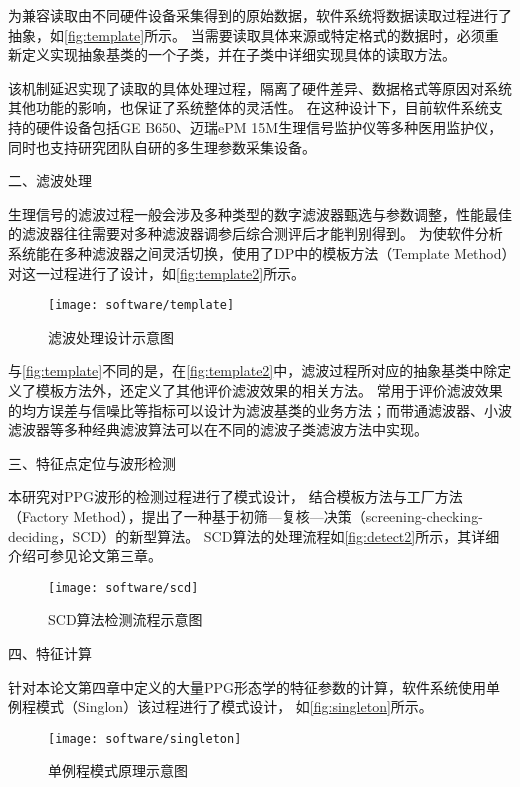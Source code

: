 为兼容读取由不同硬件设备采集得到的原始数据，软件系统将数据读取过程进行了抽象，如\autoref{fig:template}所示。
当需要读取具体来源或特定格式的数据时，必须重新定义实现抽象基类的一个子类，并在子类中详细实现具体的读取方法。


该机制延迟实现了读取的具体处理过程，隔离了硬件差异、数据格式等原因对系统其他功能的影响，也保证了系统整体的灵活性。
在这种设计下，目前软件系统支持的硬件设备包括GE B650、迈瑞ePM 15M生理信号监护仪等多种医用监护仪，
同时也支持研究团队自研的多生理参数采集设备。

二、滤波处理

生理信号的滤波过程一般会涉及多种类型的数字滤波器甄选与参数调整，性能最佳的滤波器往往需要对多种滤波器调参后综合测评后才能判别得到。
为使软件分析系统能在多种滤波器之间灵活切换，使用了DP中的模板方法（Template Method）对这一过程进行了设计\cite{Enrich2018}，如\autoref{fig:template2}所示。
\begin{figure}[htbp]
    \centering
    \texttt{[image: software/template]}
    \caption{\label{fig:template2}滤波处理设计示意图}
\end{figure}


与\autoref{fig:template}不同的是，在\autoref{fig:template2}中，滤波过程所对应的抽象基类中除定义了模板方法外，还定义了其他评价滤波效果的相关方法。
常用于评价滤波效果的均方误差与信噪比等指标可以设计为滤波基类的业务方法；而带通滤波器、小波滤波器等多种经典滤波算法可以在不同的滤波子类滤波方法中实现。

三、特征点定位与波形检测

本研究对PPG波形的检测过程进行了模式设计，
结合模板方法与工厂方法（Factory Method）\cite{Enrich2018}，提出了一种基于初筛—复核—决策（screening-checking-deciding，SCD）的新型算法。
SCD算法的处理流程如\autoref{fig:detect2}所示，其详细介绍可参见论文第三章。
\begin{figure}[htbp]
    \centering
    \texttt{[image: software/scd]}
    \caption{\label{fig:detect2}SCD算法检测流程示意图}
\end{figure}

四、特征计算

针对本论文第四章中定义的大量PPG形态学的特征参数的计算，软件系统使用单例程模式（Singlon）该过程进行了模式设计\cite{Enrich2018}，
如\autoref{fig:singleton}所示。

\begin{figure}[htbp]
    \centering
    \texttt{[image: software/singleton]}
    \caption{\label{fig:singleton}单例程模式原理示意图}
\end{figure}

